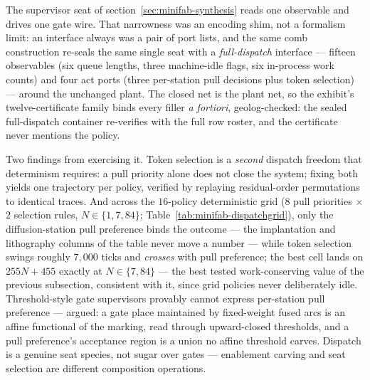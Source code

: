 The supervisor seat of section~\ref{sec:minifab-synthesis} reads
one observable and drives one gate wire. That narrowness was an
encoding shim, not a formalism limit: an interface always was a
pair of port lists, and the same comb construction re-seals the
same single seat with a \emph{full-dispatch} interface --- fifteen
observables (six queue lengths, three machine-idle flags, six
in-process work counts) and four act ports (three per-station pull
decisions plus token selection) --- around the unchanged plant. The
closed net is the plant net, so the exhibit's twelve-certificate
family binds every filler \emph{a fortiori}, geolog-checked: the
sealed full-dispatch container re-verifies with the full row
roster, and the certificate never mentions the policy.

Two findings from exercising it. Token selection is a \emph{second}
dispatch freedom that determinism requires: a pull priority alone
does not close the system; fixing both yields one trajectory per
policy, verified by replaying residual-order permutations to
identical traces. And across the $16$-policy deterministic grid
($8$ pull priorities $\times$ $2$ selection rules, $N \in
\{1, 7, 84\}$; Table~\ref{tab:minifab-dispatchgrid}), only the
diffusion-station pull preference binds the outcome --- the
implantation and lithography columns of the table never move a
number --- while token selection swings roughly $7{,}000$ ticks and
\emph{crosses} with pull preference; the best cell lands on
$255N + 455$ exactly at $N \in \{7, 84\}$ --- the best tested
work-conserving value of the previous subsection, consistent with it,
since grid policies never deliberately idle. Threshold-style gate supervisors provably
cannot express per-station pull preference --- argued: a gate place
maintained by fixed-weight fused arcs is an affine functional of
the marking, read through upward-closed thresholds, and a pull
preference's acceptance region is a union no affine threshold
carves. Dispatch is a genuine seat species, not sugar over gates
--- enablement carving and seat selection are different composition
operations.

